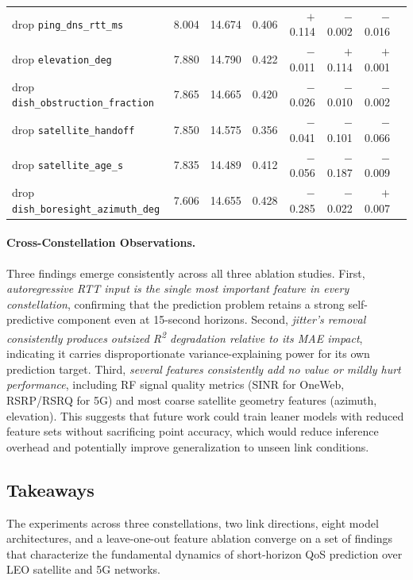 \documentclass[12pt]{article}
\begin{document}
\begin{table}[ht]
\begin{tabular}{lrrrrrrr}
drop \texttt{ping\_dns\_rtt\_ms}            & 8.004  & 14.674 & 0.406 & $+$0.114 & $-$0.002 & $-$0.016 \\
drop \texttt{elevation\_deg}                & 7.880  & 14.790 & 0.422 & $-$0.011 & $+$0.114 & $+$0.001 \\
drop \texttt{dish\_obstruction\_fraction}   & 7.865  & 14.665 & 0.420 & $-$0.026 & $-$0.010 & $-$0.002 \\
drop \texttt{satellite\_handoff}            & 7.850  & 14.575 & 0.356 & $-$0.041 & $-$0.101 & $-$0.066 \\
drop \texttt{satellite\_age\_s}             & 7.835  & 14.489 & 0.412 & $-$0.056 & $-$0.187 & $-$0.009 \\
drop \texttt{dish\_boresight\_azimuth\_deg} & 7.606  & 14.655 & 0.428 & $-$0.285 & $-$0.022 & $+$0.007 \\
\bottomrule
\end{tabular}
\end{table}

\paragraph{Cross-Constellation Observations.}
Three findings emerge consistently across all three ablation studies. First, \emph{autoregressive RTT input is the single most important feature in every constellation}, confirming that the prediction problem retains a strong self-predictive component even at 15-second horizons. Second, \emph{jitter's removal consistently produces outsized R\textsuperscript{2} degradation relative to its MAE impact}, indicating it carries disproportionate variance-explaining power for its own prediction target. Third, \emph{several features consistently add no value or mildly hurt performance}, including RF signal quality metrics (SINR for OneWeb, RSRP/RSRQ for 5G) and most coarse satellite geometry features (azimuth, elevation). This suggests that future work could train leaner models with reduced feature sets without sacrificing point accuracy, which would reduce inference overhead and potentially improve generalization to unseen link conditions.

\subsection{Takeaways}

The experiments across three constellations, two link directions, eight model architectures, and a leave-one-out feature ablation converge on a set of findings that characterize the fundamental dynamics of short-horizon QoS prediction over LEO satellite and 5G networks.
\end{document}
